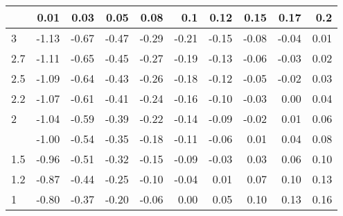 
\begin{tabular}{lrrrrrrrrr}
\toprule
  & 0.01 & 0.03 & 0.05 & 0.08 & 0.1 & 0.12 & 0.15 & 0.17 & 0.2\\
\midrule
3 & -1.13 & -0.67 & -0.47 & -0.29 & -0.21 & -0.15 & -0.08 & -0.04 & 0.01\\
2.7 & -1.11 & -0.65 & -0.45 & -0.27 & -0.19 & -0.13 & -0.06 & -0.03 & 0.02\\
2.5 & -1.09 & -0.64 & -0.43 & -0.26 & -0.18 & -0.12 & -0.05 & -0.02 & 0.03\\
2.2 & -1.07 & -0.61 & -0.41 & -0.24 & -0.16 & -0.10 & -0.03 & 0.00 & 0.04\\
2 & -1.04 & -0.59 & -0.39 & -0.22 & -0.14 & -0.09 & -0.02 & 0.01 & 0.06\\
\addlinespace
1.7 & -1.00 & -0.54 & -0.35 & -0.18 & -0.11 & -0.06 & 0.01 & 0.04 & 0.08\\
1.5 & -0.96 & -0.51 & -0.32 & -0.15 & -0.09 & -0.03 & 0.03 & 0.06 & 0.10\\
1.2 & -0.87 & -0.44 & -0.25 & -0.10 & -0.04 & 0.01 & 0.07 & 0.10 & 0.13\\
1 & -0.80 & -0.37 & -0.20 & -0.06 & 0.00 & 0.05 & 0.10 & 0.13 & 0.16\\
\bottomrule
\end{tabular}
